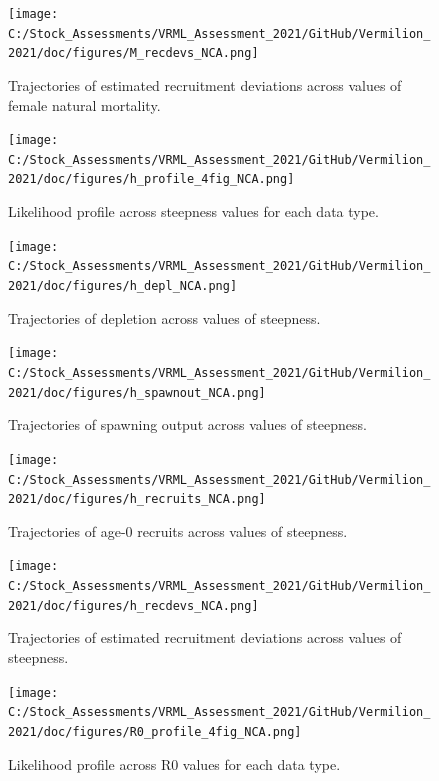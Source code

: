 \documentclass[
  english,
  a4paper,
]{article}
\begin{document}
\begin{figure}
\centering
\texttt{[image: C:/Stock\_Assessments/VRML\_Assessment\_2021/GitHub/Vermilion\_2021/doc/figures/M\_recdevs\_NCA.png]}
\caption{Trajectories of estimated recruitment deviations across values of female natural mortality.\label{fig:m-recdevs}}
\end{figure}

\begin{figure}
\centering
\texttt{[image: C:/Stock\_Assessments/VRML\_Assessment\_2021/GitHub/Vermilion\_2021/doc/figures/h\_profile\_4fig\_NCA.png]}
\caption{Likelihood profile across steepness values for each data type.\label{fig:h-profile}}
\end{figure}

\begin{figure}
\centering
\texttt{[image: C:/Stock\_Assessments/VRML\_Assessment\_2021/GitHub/Vermilion\_2021/doc/figures/h\_depl\_NCA.png]}
\caption{Trajectories of depletion across values of steepness.\label{fig:h-depl}}
\end{figure}

\begin{figure}
\centering
\texttt{[image: C:/Stock\_Assessments/VRML\_Assessment\_2021/GitHub/Vermilion\_2021/doc/figures/h\_spawnout\_NCA.png]}
\caption{Trajectories of spawning output across values of steepness.\label{fig:h-spawn}}
\end{figure}

\begin{figure}
\centering
\texttt{[image: C:/Stock\_Assessments/VRML\_Assessment\_2021/GitHub/Vermilion\_2021/doc/figures/h\_recruits\_NCA.png]}
\caption{Trajectories of age-0 recruits across values of steepness.\label{fig:h-recruits}}
\end{figure}

\begin{figure}
\centering
\texttt{[image: C:/Stock\_Assessments/VRML\_Assessment\_2021/GitHub/Vermilion\_2021/doc/figures/h\_recdevs\_NCA.png]}
\caption{Trajectories of estimated recruitment deviations across values of steepness.\label{fig:h-recdevs}}
\end{figure}

\begin{figure}
\centering
\texttt{[image: C:/Stock\_Assessments/VRML\_Assessment\_2021/GitHub/Vermilion\_2021/doc/figures/R0\_profile\_4fig\_NCA.png]}
\caption{Likelihood profile across R0 values for each data type.\label{fig:r0-profile}}
\end{figure}
\end{document}
